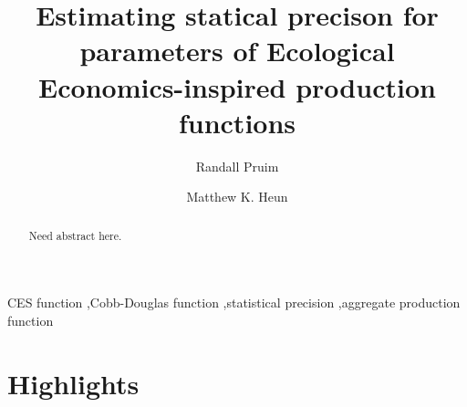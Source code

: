 \documentclass[preprint,10pt,3p]{elsarticle}\usepackage[]{graphicx}\usepackage[]{color}
\begin{document}
	
\begin{frontmatter}



\title{Estimating statical precison for parameters of Ecological Economics-inspired production functions}


\author[label1]{Randall Pruim}

\author[label2]{Matthew K. Heun}

\address[label1]{Mathematics \& Statistics Department, Calvin College, Grand
Rapids, MI 49546, USA.}

\address[label2]{Engineering Department, Calvin College, Grand Rapids, MI 49546,
USA.}

\linenumbers

\begin{abstract}	

Need abstract here. 

\end{abstract}

\begin{keyword}
CES function \sep Cobb-Douglas function \sep statistical precision \sep aggregate production function
\end{keyword}

\end{frontmatter}

\linenumbers

\section*{Highlights}
\label{sec:highlights}
\end{document}
